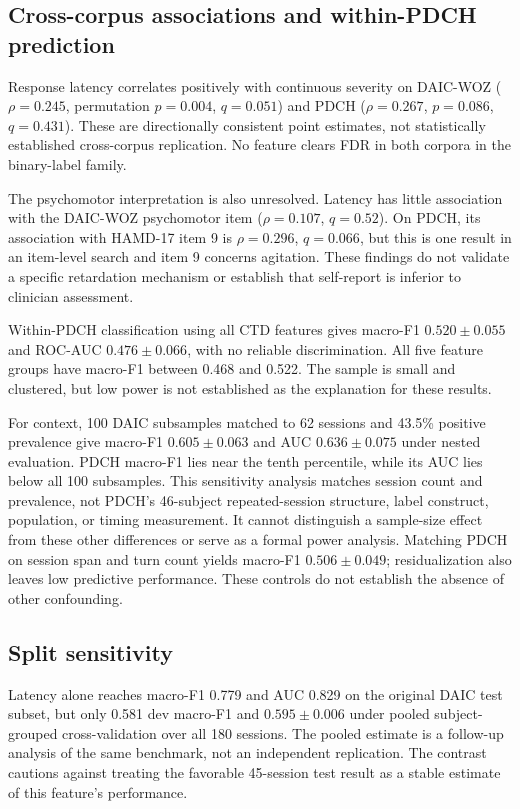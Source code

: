 \documentclass{article}
\begin{document}
\subsection{Cross-corpus associations and within-PDCH prediction}
\label{sec:audit}
Response latency correlates positively with continuous severity on DAIC-WOZ ($\rho=0.245$, permutation $p=0.004$, $q=0.051$) and PDCH ($\rho=0.267$, $p=0.086$, $q=0.431$). These are directionally consistent point estimates, not statistically established cross-corpus replication. No feature clears FDR in both corpora in the binary-label family.

The psychomotor interpretation is also unresolved. Latency has little association with the DAIC-WOZ psychomotor item ($\rho=0.107$, $q=0.52$). On PDCH, its association with HAMD-17 item 9 is $\rho=0.296$, $q=0.066$, but this is one result in an item-level search and item 9 concerns agitation. These findings do not validate a specific retardation mechanism or establish that self-report is inferior to clinician assessment.

Within-PDCH classification using all CTD features gives macro-F1 $0.520\pm0.055$ and ROC-AUC $0.476\pm0.066$, with no reliable discrimination. All five feature groups have macro-F1 between 0.468 and 0.522. The sample is small and clustered, but low power is not established as the explanation for these results.

For context, 100 DAIC subsamples matched to 62 sessions and 43.5\% positive prevalence give macro-F1 $0.605\pm0.063$ and AUC $0.636\pm0.075$ under nested evaluation. PDCH macro-F1 lies near the tenth percentile, while its AUC lies below all 100 subsamples. This sensitivity analysis matches session count and prevalence, not PDCH's 46-subject repeated-session structure, label construct, population, or timing measurement. It cannot distinguish a sample-size effect from these other differences or serve as a formal power analysis. Matching PDCH on session span and turn count yields macro-F1 $0.506\pm0.049$; residualization also leaves low predictive performance. These controls do not establish the absence of other confounding.

\subsection{Split sensitivity}
\label{sec:audit-correction}
Latency alone reaches macro-F1 0.779 and AUC 0.829 on the original DAIC test subset, but only 0.581 dev macro-F1 and $0.595\pm0.006$ under pooled subject-grouped cross-validation over all 180 sessions. The pooled estimate is a follow-up analysis of the same benchmark, not an independent replication. The contrast cautions against treating the favorable 45-session test result as a stable estimate of this feature's performance.
\end{document}
